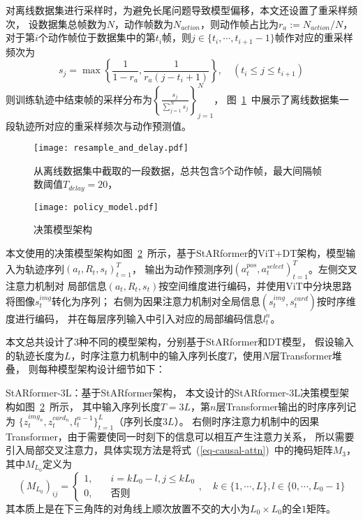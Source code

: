 对离线数据集进行采样时，为避免长尾问题导致模型偏移，本文还设置了重采样频次，
设数据集总帧数为$N$，动作帧数为$N_{action}$，则动作帧占比为$r_a:=N_{action} / N$，
对于第$i$个动作帧位于数据集中的第$t_i$帧，则$j\in\{t_{i},\cdots,t_{i+1}-1\}$帧作对应的重采样频次为
\begin{equation}\label{eq-resample-freq}
  s_j = \max\left\{\frac{1}{1-r_a}, \frac{1}{r_a(j-t_i+1)}\right\},\quad (t_i\leqslant j\leqslant t_{i+1})
\end{equation}
则训练轨迹中结束帧的采样分布为$\left\{\frac{s_j}{\sum_{j=1}^{N}s_j}\right\}_{j=1}^N$，
图~\ref{fig-resample-and-delay}~中展示了离线数据集一段轨迹所对应的重采样频次与动作预测值。
\begin{figure}[htbp]
  \centering
  \texttt{[image: resample\_and\_delay.pdf]}
  \caption{从离线数据集中截取的一段数据，总共包含5个动作帧，最大间隔帧数阈值$T_{delay} = 20$，}\label{fig-resample-and-delay}
\end{figure}

\label{sec-model-struct}
\begin{figure}[htbp]
  \centering\vspace{-2ex}
  \texttt{[image: policy\_model.pdf]}
  \caption{决策模型架构}
  \label{fig-model}
\end{figure}

本文使用的决策模型架构如图~\ref{fig-model}~所示，基于StARformer的ViT+DT架构，模型输入为轨迹序列$(a_t, R_t, s_t)_{t=1}^T$，
输出为动作预测序列$(a_t^{pos},a_t^{select})_{t=1}^T$。左侧交叉注意力机制对
局部信息$(a_t,R_t,s_t)$按空间维度进行编码，并使用ViT中分块思路将图像$s_t^{img}$转化为序列；
右侧为因果注意力机制对全局信息$(s^{img}_t,s^{card}_t)$按时序维度进行编码，
并在每层序列输入中引入对应的局部编码信息$l_t^{n}$。

本文总共设计了3种不同的模型架构，分别基于StARformer和DT模型，
假设输入的轨迹长度为$L$，时序注意力机制中的输入序列长度$T$，使用$N$层Transformer堆叠，
则每种模型架构设计细节如下：

StARformer-3L：基于StARformer架构，
本文设计的StARformer-3L决策模型架构如图~\ref{fig-model}~所示，
其中输入序列长度$T=3L$，第$n$层Transformer输出的时序序列记为
$\{z_t^{img_n},z_t^{card_n},l_{t}^{n-1}\}_{t=1}^{L}$（序列长度$3L$）。
右侧时序注意力机制中的因果Transformer，由于需要使同一时刻下的信息可以相互产生注意力关系，
所以需要引入局部交叉注意力，具体实现方法是将式~(\ref{eq-causal-attn})~中的掩码矩阵$M_{3}$，其中$M_{L_0}$定义为
\begin{equation}
  (M_{L_0})_{ij} = \begin{cases}
    1, &\quad i=kL_0-l,j\leqslant kL_0\\
    0, &\quad \text{否则}
  \end{cases},\quad k\in\{1,\cdots,L\}, l\in\{0,\cdots,L_0-1\}
\end{equation}
其本质上是在下三角阵的对角线上顺次放置不交的大小为$L_0\times L_0$的全$1$矩阵。

